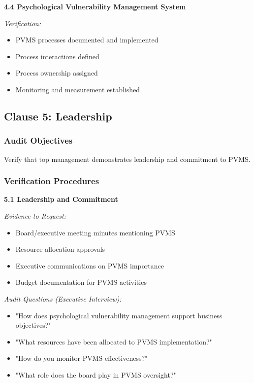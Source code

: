 \documentclass[11pt,a4paper]{article}
\begin{document}
\textbf{4.4 Psychological Vulnerability Management System}

\textit{Verification:}
\begin{itemize}
\item PVMS processes documented and implemented
\item Process interactions defined
\item Process ownership assigned
\item Monitoring and measurement established
\end{itemize}

\subsection{Clause 5: Leadership}

\subsubsection{Audit Objectives}

Verify that top management demonstrates leadership and commitment to PVMS.

\subsubsection{Verification Procedures}

\textbf{5.1 Leadership and Commitment}

\textit{Evidence to Request:}
\begin{itemize}
\item Board/executive meeting minutes mentioning PVMS
\item Resource allocation approvals
\item Executive communications on PVMS importance
\item Budget documentation for PVMS activities
\end{itemize}

\textit{Audit Questions (Executive Interview):}
\begin{itemize}
\item "How does psychological vulnerability management support business objectives?"
\item "What resources have been allocated to PVMS implementation?"
\item "How do you monitor PVMS effectiveness?"
\item "What role does the board play in PVMS oversight?"
\end{itemize}
\end{document}
